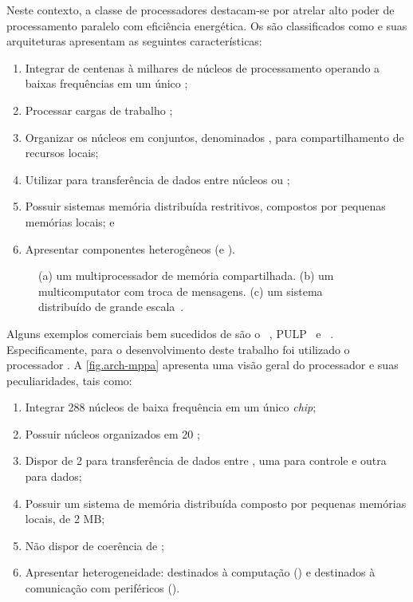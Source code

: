 Neste contexto, a classe de processadores \lws destacam-se por atrelar alto poder de processamento paralelo com eficiência energética. Os \lws são classificados como \mpsoc e suas arquiteturas apresentam as seguintes características:
\begin{enumerate}[label=(\roman*)]
    \item Integrar de centenas à milhares de núcleos de processamento operando a baixas frequências em um único \chip;
    \item Processar cargas de trabalho \mimd;
    \item Organizar os núcleos em conjuntos, denominados \clusters, para compartilhamento de recursos locais;
    \item Utilizar \nocs para transferência de dados entre núcleos ou \clusters;
    \item Possuir sistemas memória distribuída restritivos, compostos por pequenas memórias locais; e
    \item Apresentar componentes heterogêneos (\cclusters e \ioclusters).
\end{enumerate}

\begin{figure}[t]
    \centering
    
    \caption{(a) um multiprocessador de memória compartilhada. (b) um multicomputator com troca de mensagens. (c) um sistema distribuído de grande escala~\cite{tanenbaum:4ed}.}
    \label{fig.mimd}
\end{figure}

Alguns exemplos comerciais bem sucedidos de \lws são o \mppa~\cite{dinechin:2013}, PULP~\cite{pulp} e \taihulight~\cite{fu2016sunway}.
%
Especificamente, para o desenvolvimento deste trabalho foi utilizado o processador \mppa. A \autoref{fig.arch-mppa} apresenta uma visão geral do processador e suas peculiaridades, tais como:

\begin{enumerate}[label=(\roman*)]
    \item Integrar 288 núcleos de baixa frequência em um único \textit{chip};
    \item Possuir núcleos organizados em 20 \clusters;
    \item Dispor de 2 \nocs para transferência de dados entre \clusters, uma para controle e outra para dados;
    \item Possuir um sistema de memória distribuída composto por pequenas memórias locais, \eg \sram de 2 MB;
    \item Não dispor de coerência de \cache;
    \item Apresentar heterogeneidade: \clusters destinados à computação (\cclusters) e \clusters destinados à comunicação com periféricos (\ioclusters).
\end{enumerate}

